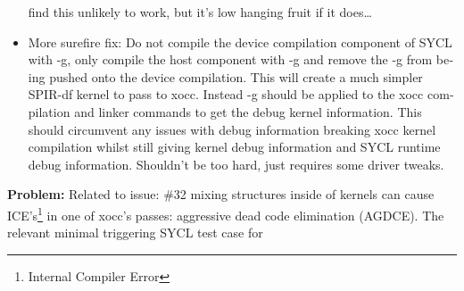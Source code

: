 \begin{otherlanguage}{english}
\begin{itemize}
                                                   find this unlikely to work,
                                                   but it's low hanging fruit if
                                                   it does\ldots
                                             \item More surefire fix: Do not
                                                   compile the device
                                                   compilation component of SYCL
                                                   with -g, only compile the
                                                   host component with -g and
                                                   remove the -g from being
                                                   pushed onto the device
                                                   compilation. This will create
                                                   a much simpler SPIR-df kernel
                                                   to pass to xocc. Instead -g
                                                   should be applied to the
                                                   xocc compilation and linker
                                                   commands to get the debug
                                                   kernel information. This
                                                   should circumvent any issues
                                                   with debug information
                                                   breaking xocc kernel
                                                   compilation whilst still
                                                   giving kernel debug
                                                   information and SYCL runtime
                                                   debug information. Shouldn't
                                                   be too hard, just requires
                                                   some driver tweaks.
                                         \end{itemize}
                                         \textbf{Problem:} Related to issue:
                                         \#32 mixing structures inside of
                                         kernels can cause ICE's\footnote{
                                         Internal Compiler Error} in one of
                                         xocc's passes: aggressive dead code
                                         elimination (AGDCE). The relevant
                                         minimal triggering SYCL test case for

\end{otherlanguage}
